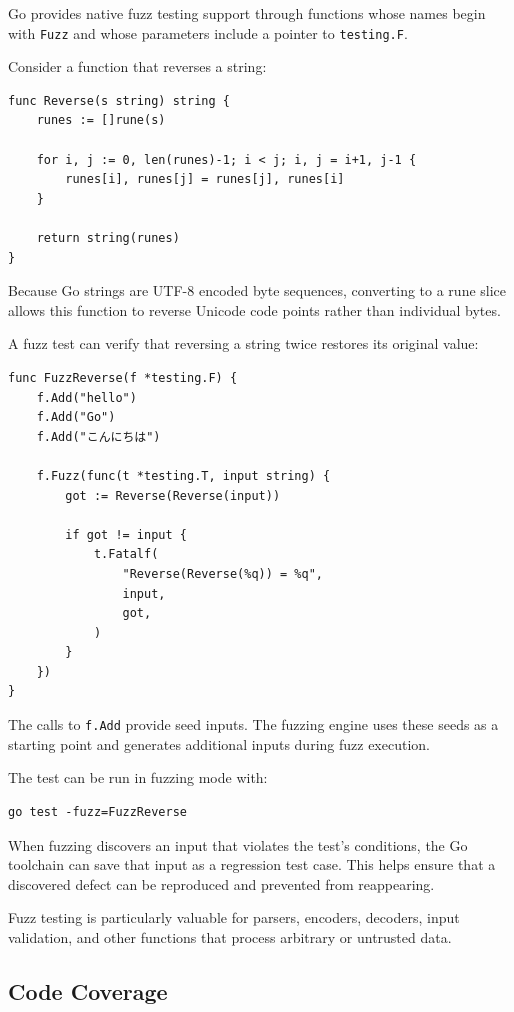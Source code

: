 Go provides native fuzz testing support through functions whose names begin with \texttt{Fuzz} and whose parameters include a pointer to \texttt{testing.F}.

Consider a function that reverses a string:

\begin{lstlisting}
func Reverse(s string) string {
    runes := []rune(s)

    for i, j := 0, len(runes)-1; i < j; i, j = i+1, j-1 {
        runes[i], runes[j] = runes[j], runes[i]
    }

    return string(runes)
}
\end{lstlisting}

Because Go strings are UTF-8 encoded byte sequences, converting to a rune slice allows this function to reverse Unicode code points rather than individual bytes.

A fuzz test can verify that reversing a string twice restores its original value:

\begin{lstlisting}
func FuzzReverse(f *testing.F) {
    f.Add("hello")
    f.Add("Go")
    f.Add("こんにちは")

    f.Fuzz(func(t *testing.T, input string) {
        got := Reverse(Reverse(input))

        if got != input {
            t.Fatalf(
                "Reverse(Reverse(%q)) = %q",
                input,
                got,
            )
        }
    })
}
\end{lstlisting}

The calls to \texttt{f.Add} provide seed inputs. The fuzzing engine uses these seeds as a starting point and generates additional inputs during fuzz execution.

The test can be run in fuzzing mode with:

\begin{lstlisting}
go test -fuzz=FuzzReverse
\end{lstlisting}

When fuzzing discovers an input that violates the test's conditions, the Go toolchain can save that input as a regression test case. This helps ensure that a discovered defect can be reproduced and prevented from reappearing.

Fuzz testing is particularly valuable for parsers, encoders, decoders, input validation, and other functions that process arbitrary or untrusted data.

\subsection{Code Coverage}


